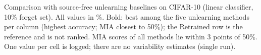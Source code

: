 \begin{table}[t]
  \centering
  
  \caption{Comparison with source-free unlearning baselines on CIFAR-10 (linear classifier, 10\% forget set). All values in \%. Bold: best among the five unlearning methods per column (highest accuracy; MIA closest to 50\%); the Retrained row is the reference and is not ranked. MIA scores of all methods lie within 3 points of 50\%. One value per cell is logged; there are no variability estimates (single run).}
  \label{tab:baselines}
\end{table}
